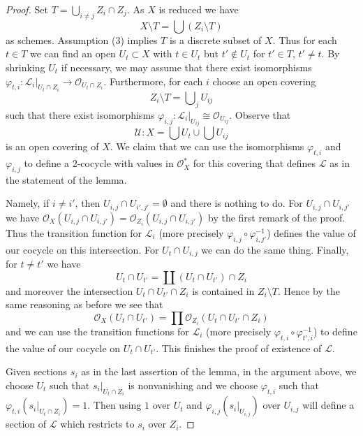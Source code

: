 \begin{proof}
Set $T = \bigcup_{i \not = j} Z_i \cap Z_j$. As $X$ is reduced we have
$$
X \setminus T = \bigcup (Z_i \setminus T)
$$
as schemes. Assumption (3) implies $T$ is a discrete subset of $X$.
Thus for each $t \in T$ we can find an open $U_t \subset X$
with $t \in U_t$ but $t' \not \in U_t$ for $t' \in T$, $t' \not = t$.
By shrinking $U_t$ if necessary, we may assume that there exist isomorphisms
$\varphi_{t, i} : \mathcal{L}_i|_{U_t \cap Z_i} \to
\mathcal{O}_{U_t \cap Z_i}$. Furthermore, for each $i$ choose an open covering
$$
Z_i \setminus T = \bigcup\nolimits_j U_{ij}
$$
such that there exist isomorphisms
$\varphi_{i, j} : \mathcal{L}_i|_{U_{ij}} \cong \mathcal{O}_{U_{ij}}$.
Observe that
$$
\mathcal{U} : X = \bigcup U_t \cup \bigcup U_{ij}
$$
is an open covering of $X$. We claim that we can use the isomorphisms
$\varphi_{t, i}$ and $\varphi_{i, j}$ to define a $2$-cocycle with values
in $\mathcal{O}_X^*$ for this covering that defines $\mathcal{L}$ as
in the statement of the lemma.

\medskip\noindent
Namely, if $i \not = i'$, then $U_{i, j} \cap U_{i', j'} = \emptyset$
and there is nothing to do. For $U_{i, j} \cap U_{i, j'}$ we have
$\mathcal{O}_X(U_{i, j} \cap U_{i, j'}) =
\mathcal{O}_{Z_i}(U_{i, j} \cap U_{i, j'})$ by the first remark of the proof.
Thus the transition function for $\mathcal{L}_i$ (more precisely
$\varphi_{i, j} \circ \varphi_{i, j'}^{-1}$) defines the value of our
cocycle on this intersection.
For $U_t \cap U_{i, j}$ we can do the same thing.
Finally, for $t \not = t'$ we have
$$
U_t \cap U_{t'} = \coprod (U_t \cap U_{t'}) \cap Z_i
$$
and moreover the intersection $U_t \cap U_{t'} \cap Z_i$ is contained
in $Z_i \setminus T$. Hence by the same reasoning as before we see that
$$
\mathcal{O}_X(U_t \cap U_{t'}) =
\prod \mathcal{O}_{Z_i}(U_t \cap U_{t'} \cap Z_i)
$$
and we can use the transition functions for $\mathcal{L}_i$ (more precisely
$\varphi_{t, i} \circ \varphi_{t', i}^{-1}$) to define the value of
our cocycle on $U_t \cap U_{t'}$. This finishes the proof of existence
of $\mathcal{L}$.

\medskip\noindent
Given sections $s_i$ as in the last assertion of the lemma, in the argument
above, we choose $U_t$ such that $s_i|_{U_t \cap Z_i}$ is nonvanishing and
we choose $\varphi_{t, i}$ such that $\varphi_{t, i}(s_i|_{U_t \cap Z_i}) = 1$.
Then using $1$ over $U_t$ and $\varphi_{i, j}(s_i|_{U_{i, j}})$ over
$U_{i, j}$ will define a section of $\mathcal{L}$ which restricts
to $s_i$ over $Z_i$.
\end{proof}

